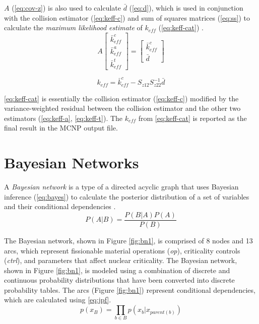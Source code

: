 \noindent $A$ (\ref{eq:cov-z}) is also used to calculate $\bar{d}$ (\ref{eq:d}), which is used in conjunction with the collision estimator (\ref{eq:keff-c}) and sum of squares matrices (\ref{eq:ss}) to calculate the \textit{maximum likelihood estimate} of $k_{eff}$ (\ref{eq:keff-cat}) \cite{urbatsch}.
%
\begin{equation}
  \label{eq:d}
  A
  \left[
  \begin{matrix}
    \bar{k}_{eff}^{c} \\
    \bar{k}_{eff}^{a} \\
    \bar{k}_{eff}^{t}
  \end{matrix}
  \right] =
  \left[
  \begin{matrix}
    \bar{k}_{eff}^{c} \\
    \bar{d}
  \end{matrix}
  \right]
\end{equation}

\begin{equation}
  \label{eq:keff-cat}
  k_{eff} = \bar{k}_{eff}^{c} - S_{z12} S_{z22}^{-1} \bar{d}
\end{equation}

\noindent \ref{eq:keff-cat} is essentially the collision estimator (\ref{eq:keff-c}) modified by the variance-weighted residual between the collision estimator and the other two estimators (\ref{eq:keff-a}, \ref{eq:keff-t}).
The $k_{eff}$ from \ref{eq:keff-cat} is reported as the final result in the MCNP output file.


\section{Bayesian Networks}

A \textit{Bayesian network} is a type of a directed acyclic graph that uses Bayesian inference (\ref{eq:bayes}) to calculate the posterior distribution of a set of variables and their conditional dependencies \cite{koller,pearl}.
%
\begin{equation}
  \label{eq:bayes}
  P(A|B) = \frac{P(B|A)P(A)}{P(B)}
\end{equation}

\noindent The Bayesian network, shown in Figure \ref{fig:bn1}, is comprised of 8 nodes and 13 arcs, which represent fissionable material operations (\textit{op}), criticality controls (\textit{ctrl}), and parameters that affect nuclear criticality.
The Bayesian network, shown in Figure \ref{fig:bn1}, is modeled using a combination of discrete and continuous probability distributions that have been converted into discrete probability tables.
The arcs (Figure \ref{fig:bn1}) represent conditional dependencies, which are calculated using \ref{eq:jpf}.
%
\begin{equation}
  \label{eq:jpf}
  p(x_{B}) = \prod_{b \in B} p(x_{b} | x_{parent(b)})
\end{equation}


